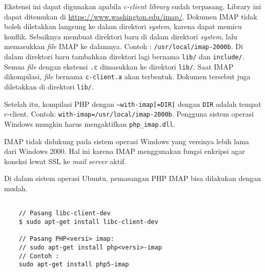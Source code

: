 Ekstensi ini dapat digunakan apabila \textit{c-client library} sudah terpasang. Library ini dapat ditemukan di \url{https://www.washington.edu/imap/}. Dokumen IMAP tidak boleh diletakkan langsung ke dalam direktori \textit{system}, karena dapat memicu konflik. Sebaiknya membuat direktori baru di dalam direktori \textit{system}, lalu memasukkan \textit{file} IMAP ke dalamnya. Contoh : \texttt{/usr/local/imap-2000b}. Di dalam direktori baru tambahkan direktori lagi bernama \texttt{lib/} dan \texttt{include/}. Semua \textit{file} dengan ekstensi \texttt{.c} dimasukkan ke direktori \texttt{lib/}. Saat IMAP dikompilasi, \textit{file} bernama \texttt{c-client.a} akan terbentuk. Dokumen tersebut juga diletakkan di direktori \texttt{lib/}.

Setelah itu, kompilasi PHP dengan \texttt{--with-imap[=DIR]} dengan \texttt{DIR} adalah tempat c-client. Contoh: \texttt{with-imap=/usr/local/imap-2000b}. Pengguna sistem operasi Windows mungkin harus mengaktifkan \texttt{php\_imap.dll}.

IMAP tidak didukung pada sistem operasi Windows yang versinya lebih lama dari Windows 2000. Hal ini karena IMAP menggunakan fungsi enkripsi agar koneksi lewat SSL ke \textit{mail server} aktif.

Di dalam sistem operasi Ubuntu, pemasangan PHP IMAP bisa dilakukan dengan mudah.
\begin{lstlisting}
	
	// Pasang libc-client-dev
	$ sudo apt-get install libc-client-dev

	// Pasang PHP<versi> imap:
	// sudo apt-get install php<versi>-imap
	// Contoh : 
	sudo apt-get install php5-imap
		
\end{lstlisting}


